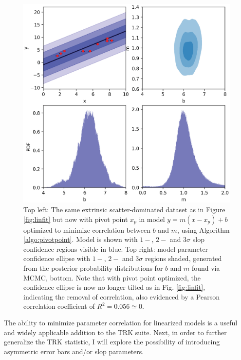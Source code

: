 \begin{figure}
    \centering
    \includegraphics[width=1.0\linewidth]{figures/linfit_sloppy_3shadenoback_pivot.eps}
    \caption{Top left: The same extrinsic scatter-dominated dataset as in Figure \ref{fig:linfit} but now with pivot point $x_p$ in model $y=m(x-x_p)+b$ optimized to minimize correlation between $b$ and $m$, using Algorithm \ref{algo:pivotpoint}. Model is shown with $1-$, $2-$ and $3\sigma$ slop confidence regions visible in blue. Top right: model parameter confidence ellipse with $1-$, $2-$ and $3\sigma$ regions shaded, generated from the posterior probability distributions for $b$ and $m$ found via MCMC, bottom. Note that with pivot point optimized, the confidence ellipse is now no longer tilted as in Fig. \ref{fig:linfit}, indicating the removal of correlation, also evidenced by a Pearson correlation coefficient of $R^2=0.056\simeq 0$.}
    \label{fig:linfitnocorr}
\end{figure}

The ability to minimize parameter correlation for linearized models is a useful and widely applicable addition to the TRK suite. Next, in order to further generalize the TRK statistic, I will explore the possibility of introducing asymmetric error bars and/or slop parameters.

